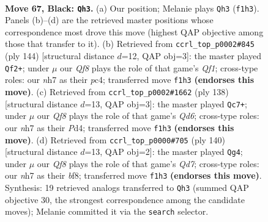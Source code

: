 \documentclass[11pt]{article}
\begin{document}
\clearpage

\begin{figure}[p]\centering
\begin{subfigure}{0.46\textwidth}\centering
\resizebox{\linewidth}{!}{%
\newchessgame
\chessboard[
  setfen={8/1Q4KN/8/k7/8/8/8/5q2 b - - 4 67},
  showmover=false,
  pgfstyle=straightmove, color=movearrow, markmove={f1-h3}
]}
\caption{}
\end{subfigure}\hfill
\begin{subfigure}{0.46\textwidth}\centering
\resizebox{\linewidth}{!}{%
\newchessgame
\chessboard[
  setfen={2K5/8/3q4/8/2p4P/8/7k/5Q2 w - - 0 73},
  showmover=false,
  pgfstyle=straightmove, color=movearrow, markmove={f1-f2}
]}
\caption{}
\end{subfigure}
\\[4pt]
\begin{subfigure}{0.46\textwidth}\centering
\resizebox{\linewidth}{!}{%
\newchessgame
\chessboard[
  setfen={8/7k/3Q4/8/2pP4/8/5K2/7q w - - 15 70},
  showmover=false,
  pgfstyle=straightmove, color=movearrow, markmove={d6-c7}
]}
\caption{}
\end{subfigure}\hfill
\begin{subfigure}{0.46\textwidth}\centering
\resizebox{\linewidth}{!}{%
\newchessgame
\chessboard[
  setfen={5b1k/3Q4/K7/4q2P/8/8/8/8 w - - 0 71},
  showmover=false,
  pgfstyle=straightmove, color=movearrow, markmove={d7-g4}
]}
\caption{}
\end{subfigure}
\caption{\textbf{Move 67, Black: \texttt{Qh3}.} (a) Our position; Melanie plays \texttt{Qh3} (\texttt{f1h3}). Panels (b)--(d) are the retrieved master positions whose correspondence most drove this move (highest QAP objective among those that transfer to it). (b) Retrieved from \texttt{ccrl\_top\_p0002\#845} (ply 144) [structural distance $d$=12, QAP obj=3]: the master played \texttt{Qf2+}; under $\mu$ our \emph{Qf8} plays the role of that game's \emph{Qf1}; cross-type roles: our \emph{n}h7 as their \emph{p}c4; transferred move \texttt{f1h3} \textbf{(endorses this move)}. (c) Retrieved from \texttt{ccrl\_top\_p0002\#1662} (ply 138) [structural distance $d$=13, QAP obj=3]: the master played \texttt{Qc7+}; under $\mu$ our \emph{Qf8} plays the role of that game's \emph{Qd6}; cross-type roles: our \emph{n}h7 as their \emph{P}d4; transferred move \texttt{f1h3} \textbf{(endorses this move)}. (d) Retrieved from \texttt{ccrl\_top\_p0000\#705} (ply 140) [structural distance $d$=13, QAP obj=2]: the master played \texttt{Qg4}; under $\mu$ our \emph{Qf8} plays the role of that game's \emph{Qd7}; cross-type roles: our \emph{n}h7 as their \emph{b}f8; transferred move \texttt{f1h3} \textbf{(endorses this move)}. Synthesis: 19 retrieved analogs transferred to \texttt{Qh3} (summed QAP objective 30, the strongest correspondence among the candidate moves); Melanie committed it via the \texttt{search} selector.}
\label{fig:thought-m133}
\end{figure}
\end{document}
